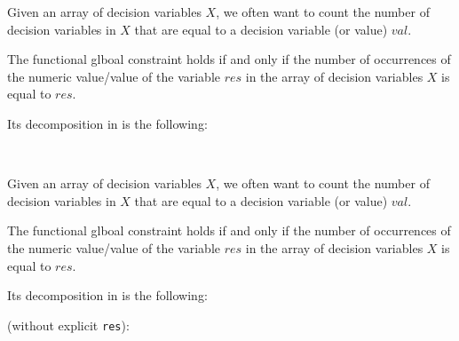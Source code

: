 \documentclass{cons-beamer}
\begin{document}
\begin{flashcardcpmpy}
\begin{frame}
  Given an array of decision variables $X$, we often want to count
  the number of decision variables in
  $X$ that are equal to a decision variable (or value) $val$.
  \vfill
  
  \begin{definition}
    The  functional glboal constraint holds if and only if the number of occurrences of the numeric value/value of the variable $res$ in the array of decision variables $X$ is equal to $res$.
  \end{definition}\vfill
  
  Its decomposition in \CPMpy is the following: \\
  \vfill
  
  \begin{example}
     \\ 
  \end{example}
\end{frame}

\begin{frame}
  Given an array of decision variables $X$, we often want to count
  the number of decision variables in
  $X$ that are equal to a decision variable (or value) $val$.
  \vfill
  
  \begin{definition}
    The  functional glboal constraint holds if and only if the number of occurrences of the numeric value/value of the variable $res$ in the array of decision variables $X$ is equal to $res$.
  \end{definition}\vfill
  
  Its decomposition in \CPMpy is the following: \\
  \vfill
  
   (without explicit \texttt{res}):
  \begin{example}
  \end{example}
\end{frame}
\end{flashcardcpmpy}
\end{document}
